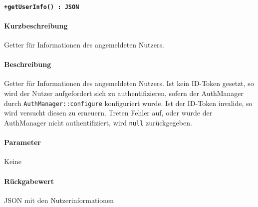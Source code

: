 \paragraph{\texttt{+getUserInfo() : JSON}}%
\paragraph*{Kurzbeschreibung}
Getter für Informationen des angemeldeten Nutzers.
\paragraph*{Beschreibung}
Getter für Informationen des angemeldeten Nutzers.
Ist kein ID-Token gesetzt, so wird der Nutzer aufgefordert sich zu authentifizieren, sofern der AuthManager durch \verb#AuthManager::configure# konfiguriert wurde.
Ist der ID-Token invalide, so wird versucht diesen zu erneuern.
Treten Fehler auf, oder wurde der AuthManager nicht authentifiziert, wird \verb#null# zurückgegeben.
\paragraph*{Parameter}
Keine
\paragraph*{Rückgabewert}
JSON mit den Nutzerinformationen
